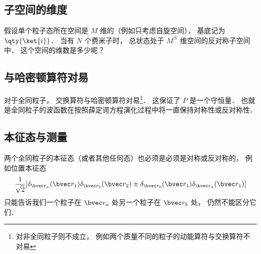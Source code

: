 \subsection{子空间的维度}
假设单个粒子态所在空间是 $M$ 维的（例如只考虑自旋空间）， 基底记为 $\qty{\ket{i}}$． 当有 $N$ 个费米子时， 总状态处于 $M^N$ 维空间的反对称子空间中． 这个空间的维数是多少呢？  




\subsection{与哈密顿算符对易}

对于全同粒子， 交换算符与哈密顿算符对易\footnote{对非全同粒子则不成立， 例如两个质量不同的粒子的动能算符与交换算符不对易}． 这保证了 $P$ 是一个守恒量． 也就是全同粒子的波函数在按照薛定谔方程演化过程中将一直保持对称性或反对称性．






\subsection{本征态与测量}
两个全同粒子的本征态（或者其他任何态）也必须是必须是对称或反对称的， 例如位置本征态
$$\frac{1}{\sqrt 2}[\delta_{\bvec r_a}(\bvec r_1) \delta_{\bvec r_b}(\bvec r_2)\pm \delta_{\bvec r_b}(\bvec r_1) \delta_{\bvec r_a}(\bvec r_1)]$$
只能告诉我们一个粒子在 $\bvec r_a$ 处另一个粒子在 $\bvec r_b$ 处， 仍然不能区分它们．

